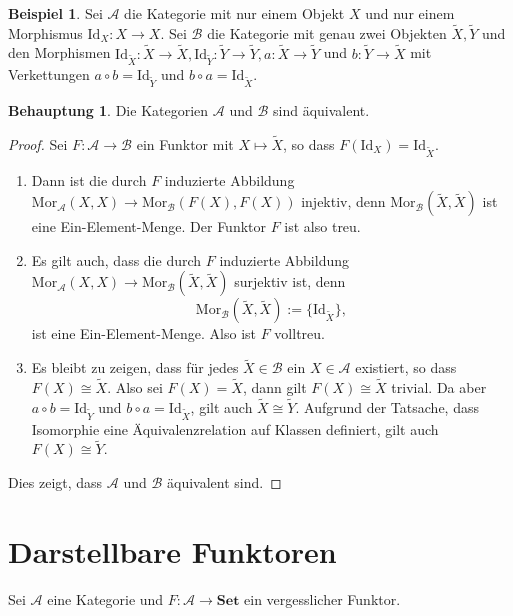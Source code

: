 \documentclass[leqno]{article}
\theoremstyle{plain}
\theoremstyle{definition}
\newtheorem{conj}{Behauptung}[section]
\newtheorem{exmp}{Beispiel}[section]
\theoremstyle{remark}
\begin{document}
\begin{exmp}
Sei $\mathcal{A}$ die Kategorie mit nur einem Objekt $X$ und nur einem Morphismus $\text{Id}_X: X \rightarrow X$. Sei $\mathcal{B}$ die Kategorie mit genau zwei Objekten $\widetilde{X}, \widetilde{Y}$ und den Morphismen $\text{Id}_{\widetilde{X}}:\widetilde{X} \rightarrow \widetilde{X}, \text{Id}_{\widetilde{Y}}: \widetilde{Y} \rightarrow \widetilde{Y}, a: \widetilde{X} \rightarrow \widetilde{Y}$ und $b: \widetilde{Y} \rightarrow \widetilde{X}$ mit Verkettungen $a \circ b = \text{Id}_{\widetilde{Y}}$ und $b \circ a = \text{Id}_{\widetilde{X}}$. 
\begin{conj}
Die Kategorien $\mathcal{A}$ und $\mathcal{B}$ sind äquivalent.
\end{conj}
\begin{proof}
Sei $F: \mathcal{A} \rightarrow \mathcal{B}$ ein Funktor mit $X \mapsto \widetilde{X}$, so dass $F(\text{Id}_X) = \text{Id}_{\widetilde{X}}$.
\begin{enumerate}
	\item Dann ist die durch $F$ induzierte Abbildung $\text{Mor}_\mathcal{A}(X,X) \rightarrow \text{Mor}_{\mathcal{B}}(F(X),F(X))$ injektiv, denn $\text{Mor}_{\mathcal{B}}(\widetilde{X},\widetilde{X})$ ist eine Ein-Element-Menge. Der Funktor $F$ ist also treu.
	\item Es gilt auch, dass die durch $F$ induzierte Abbildung $\text{Mor}_\mathcal{A}(X,X) \rightarrow \text{Mor}_{\mathcal{B}}(\widetilde{X},\widetilde{X})$ surjektiv ist, denn
	\begin{equation}
		\text{Mor}_{\mathcal{B}}(\widetilde{X},\widetilde{X}) := \{\text{Id}_{\widetilde{X}}\},
	\end{equation}
	ist eine Ein-Element-Menge. Also ist $F$ volltreu.
	\item Es bleibt zu zeigen, dass für jedes $\widetilde{X} \in \mathcal{B}$ ein $X \in \mathcal{A}$ existiert, so dass $F(X) \cong \widetilde{X}$. Also sei $F(X) = \widetilde{X}$, dann gilt $F(X) \cong \widetilde{X}$ trivial. Da aber $a \circ b = \text{Id}_{\widetilde{Y}}$ und $b \circ a = \text{Id}_{\widetilde{X}}$, gilt auch $\widetilde{X} \cong \widetilde{Y}$. Aufgrund der Tatsache, dass Isomorphie eine Äquivalenzrelation auf Klassen definiert, gilt auch $F(X) \cong \widetilde{Y}$.
\end{enumerate}
Dies zeigt, dass $\mathcal{A}$ und $\mathcal{B}$ äquivalent sind.
\end{proof}
\end{exmp}

\section{Darstellbare Funktoren}
Sei $\mathcal{A}$ eine Kategorie und $F: \mathcal{A} \rightarrow \textbf{Set}$ ein vergesslicher Funktor.
\end{document}
